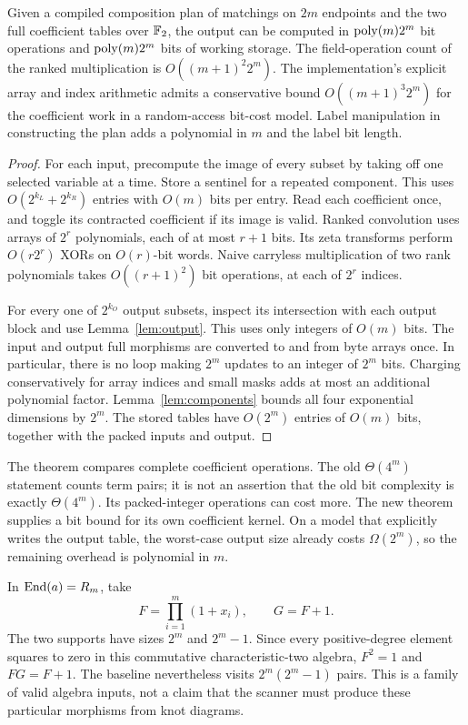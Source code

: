\begin{theorem}
\label{thm:densecost}
Given a compiled composition plan of matchings on $2m$ endpoints and the
two full coefficient tables over $\mathbb F_2$, the output can be computed in
$\operatorname{poly}(m)2^m$ bit operations and $\operatorname{poly}(m)2^m$ bits of working storage.
The field-operation count of the ranked multiplication is
$O((m+1)^2 2^m)$. The implementation's explicit array and index arithmetic
admits a conservative bound $O((m+1)^3 2^m)$ for the coefficient work in a
random-access bit-cost model. Label manipulation in constructing the plan
adds a polynomial in $m$ and the label bit length.
\end{theorem}
\begin{proof}
For each input, precompute the image of every subset by taking off one
selected variable at a time. Store a sentinel for a repeated component.
This uses $O(2^{k_L}+2^{k_R})$ entries with $O(m)$ bits per entry.
Read each coefficient once, and toggle its contracted coefficient if its
image is valid. Ranked convolution uses arrays of $2^r$ polynomials, each
of at most $r+1$ bits. Its zeta transforms perform $O(r2^r)$ XORs on
$O(r)$-bit words. Naive carryless multiplication of two rank polynomials
takes $O((r+1)^2)$ bit operations, at each of $2^r$ indices.

For every one of $2^{k_O}$ output subsets, inspect its intersection with
each output block and use Lemma~\ref{lem:output}. This uses only integers
of $O(m)$ bits. The input and output full morphisms are converted to and
from byte arrays once. In particular, there is no loop making $2^m$
updates to an integer of $2^m$ bits. Charging conservatively for array
indices and small masks adds at most an additional polynomial factor.
Lemma~\ref{lem:components} bounds all four exponential dimensions by
$2^m$. The stored tables have $O(2^m)$ entries of $O(m)$ bits, together
with the packed inputs and output.
\end{proof}

\begin{remark}
The theorem compares complete coefficient operations. The old
$\Theta(4^m)$ statement counts term pairs; it is not an assertion that
the old bit complexity is exactly $\Theta(4^m)$. Its packed-integer
operations can cost more. The new theorem supplies a bit bound for its
own coefficient kernel. On a model that explicitly writes the output
table, the worst-case output size already costs $\Omega(2^m)$, so the
remaining overhead is polynomial in $m$.
\end{remark}

\begin{example}
In $\operatorname{End}(a)=R_m$, take
\[
 F=\prod_{i=1}^m(1+x_i),\qquad G=F+1.
\]
The two supports have sizes $2^m$ and $2^m-1$. Since every positive-degree
element squares to zero in this commutative characteristic-two algebra,
$F^2=1$ and $FG=F+1$. The baseline nevertheless visits
$2^m(2^m-1)$ pairs. This is a family of valid algebra inputs, not a claim
that the scanner must produce these particular morphisms from knot
diagrams.
\end{example}
